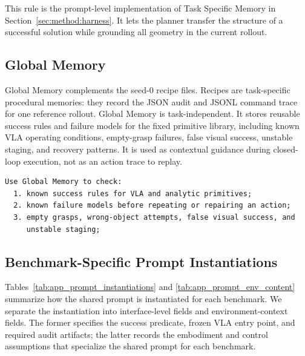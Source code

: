 \documentclass{article}
\begin{document}
This rule is the prompt-level implementation of Task Specific Memory in
Section~\ref{sec:method:harness}. It lets the planner transfer the structure of a
successful solution while grounding all geometry in the current rollout.

\subsection{Global Memory}
  \label{app:agent_prompt:global_memory}

  Global Memory complements the seed-0 recipe files. Recipes are task-specific
  procedural memories: they record the JSON audit and JSONL command trace for one
  reference rollout. Global Memory is task-independent. It stores reusable success rules
  and failure models for the fixed primitive library, including known VLA operating
  conditions, empty-grasp failures, false visual success, unstable staging, and recovery
  patterns. It is used as contextual guidance during closed-loop execution, not as an
  action trace to replay.

  \begin{samepage}
  \begin{lstlisting}[frame=single,framerule=0.5pt]
  Use Global Memory to check:
  1. known success rules for VLA and analytic primitives;
  2. known failure models before repeating or repairing an action;
  3. empty grasps, wrong-object attempts, false visual success, and
     unstable staging;
  \end{lstlisting}
  \end{samepage}

\subsection{Benchmark-Specific Prompt Instantiations}
\label{app:agent_prompt:instantiations}

Tables~\ref{tab:app_prompt_instantiations} and
\ref{tab:app_prompt_env_content} summarize how the shared prompt is instantiated for
each benchmark. We separate the instantiation into interface-level fields and
environment-context fields. The former specifies the success predicate, frozen VLA
entry point, and required audit artifacts; the latter records the embodiment and
control assumptions that specialize the shared prompt for each benchmark.
\end{document}
